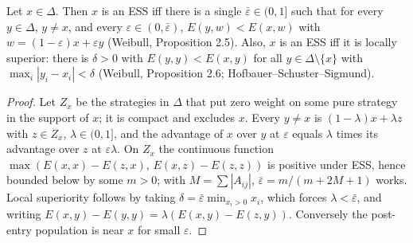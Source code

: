 \begin{theorem}
\label{thm:beh-ess-uniform}
\leanok
Let $x\in\Delta$. Then $x$ is an ESS iff there is a single $\bar\varepsilon\in(0,1]$ such that for every $y\in\Delta$,
$y\ne x$, and every $\varepsilon\in(0,\bar\varepsilon)$, $E(y,w)<E(x,w)$ with $w=(1-\varepsilon)x+\varepsilon y$
(Weibull, Proposition 2.5). Also, $x$ is an ESS iff it is locally superior: there is $\delta>0$ with $E(y,y)<E(x,y)$ for all
$y\in\Delta\setminus\{x\}$ with $\max_i|y_i-x_i|<\delta$ (Weibull, Proposition 2.6; Hofbauer--Schuster--Sigmund).
\end{theorem}
\begin{proof}
\leanok
Let $Z_x$ be the strategies in $\Delta$ that put zero weight on some pure strategy in the support of $x$; it is compact and
excludes $x$. Every $y\ne x$ is $(1-\lambda)x+\lambda z$ with $z\in Z_x$, $\lambda\in(0,1]$, and the advantage of $x$ over
$y$ at $\varepsilon$ equals $\lambda$ times its advantage over $z$ at $\varepsilon\lambda$. On $Z_x$ the continuous
function $\max(E(x,x)-E(z,x),\,E(x,z)-E(z,z))$ is positive under ESS, hence bounded below by some $m>0$; with
$M=\sum|A_{ij}|$, $\bar\varepsilon=m/(m+2M+1)$ works. Local superiority follows by taking $\delta=\bar\varepsilon\min_{x_i>0}x_i$,
which forces $\lambda<\bar\varepsilon$, and writing $E(x,y)-E(y,y)=\lambda(E(x,y)-E(z,y))$. Conversely the post-entry
population is near $x$ for small $\varepsilon$.
\end{proof}

